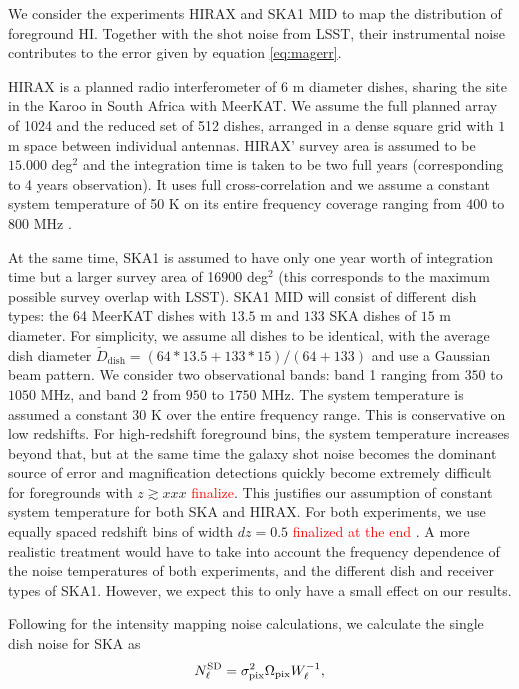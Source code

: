 \documentclass[useAMS,usenatbib]{mnras}
\newcommand{\ama}[1]{\textcolor{red}{{#1}}}
\begin{document}
We consider the experiments HIRAX and SKA1 MID to map the distribution of foreground HI. Together with the shot noise from LSST, their instrumental noise contributes to the error given by equation \ref{eq:magerr}.

HIRAX is a planned radio interferometer of $6$ m diameter dishes, sharing the site in the Karoo in South Africa with MeerKAT. We assume the full planned array of 1024 and the reduced set of 512 dishes, arranged in a dense square grid with $1$ m space between individual antennas. HIRAX' survey area is assumed to be $15.000$ deg${}^2$ and the integration time is taken to be two full years (corresponding to 4 years observation). It uses full cross-correlation and we assume a constant system temperature of 50 K on its entire frequency coverage ranging from $400$ to $800$ MHz \citep{2016SPIE.9906E..5XN}.


At the same time, SKA1 is assumed to have only one year worth of integration time but a larger survey area of 16900 deg${}^2$ (this corresponds to the maximum possible survey overlap with LSST). SKA1 MID will consist of different dish types: the 64 MeerKAT dishes with $13.5$ m and $133$ SKA dishes of $15$ m diameter. For simplicity, we assume all dishes to be identical, with the average dish diameter $\tilde{D}_\mathrm{dish} = (64*13.5 + 133*15)/(64+133)$ and use a Gaussian beam pattern. We consider two observational bands: band 1 ranging from $350$ to $1050$ MHz, and band 2 from $950$ to $1750$ MHz. The system temperature is assumed a constant $30$ K over the entire frequency range. This is conservative on low redshifts. For high-redshift foreground bins, the system temperature increases beyond that, but at the same time the galaxy shot noise becomes the dominant source of error and magnification detections quickly become extremely difficult for foregrounds with $z \gtrsim xxx$ \ama{finalize}. This justifies our assumption of constant system temperature for both SKA and HIRAX. For both experiments, we use equally spaced redshift bins of width $dz = 0.5$ \ama{finalized at the end} . A more realistic treatment would have to take into account the frequency dependence of the noise temperatures of both experiments, and the different dish and receiver types of SKA1. However, we expect this to only have a small effect on our results.


Following \cite{0004-637X-803-1-21} for the intensity mapping noise calculations, we calculate the single dish noise for SKA as
\begin{equation}
  N^{\rm SD}_\ell = \sigma_\mathrm{pix}^2\Omega_\mathrm{pix}W_\ell^{-1},
\end{equation}
\end{document}
